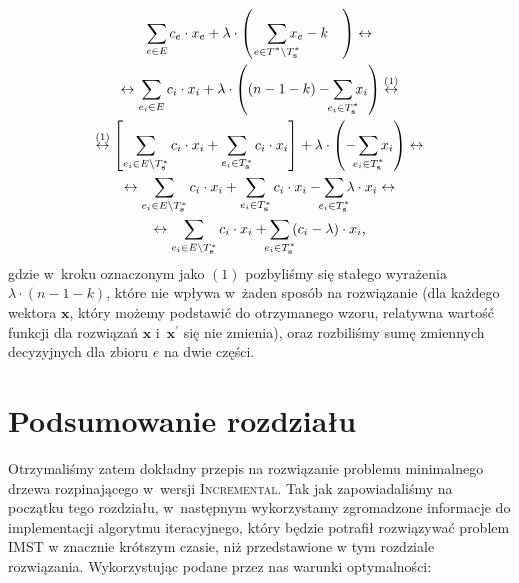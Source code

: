 \begin{gather}\label{eq:imstcosts}
	\sum_{\mathclap{e \in E}} c_{e} \cdot x_{e} + \lambda \cdot \left( \quad \sum_{\mathclap{e \in T^{\ast} \setminus T^{\ast}_{\textbf{s}}}} x_{e} - k \quad \right) \leftrightarrow \\
	\leftrightarrow \sum_{e_{i} \in E} c_{i} \cdot x_{i} + \lambda \cdot \left( \left( n - 1 - k \right) - \sum_{\mathclap{e_{i} \in T^{\ast}_{\textbf{s}}}} x_{i} \right) \overset{\left( 1 \right)}{\leftrightarrow}\\
	\overset{\left( 1 \right)}{\leftrightarrow} \left[ \sum_{e_{i} \in E \setminus T^{\ast}_{\textbf{s}}} c_{i} \cdot x_{i} + \sum_{e_{i} \in T^{\ast}_{\textbf{s}}} c_{i} \cdot x_{i} \right] + \lambda \cdot \left( - \sum_{\mathclap{e_{i} \in T^{\ast}_{\textbf{s}}}} x_{i} \right) \leftrightarrow \\
	\leftrightarrow \sum_{e_{i} \in E \setminus T^{\ast}_{\textbf{s}}} c_{i} \cdot x_{i} + \sum_{e_{i} \in T^{\ast}_{\textbf{s}}} c_{i} \cdot x_{i} - \sum_{\mathclap{e_{i} \in T^{\ast}_{\textbf{s}}}} \lambda \cdot x_{i} \leftrightarrow \\
	\leftrightarrow \sum_{e_{i} \in E \setminus T^{\ast}_{\textbf{s}}} c_{i} \cdot x_{i} + \sum_{\mathclap{e_{i} \in T^{\ast}_{\textbf{s}}}} \left( c_{i} - \lambda \right) \cdot x_{i}\label{eq:imstcosts:e}\text{,}
\end{gather}
gdzie w~kroku oznaczonym jako $\left( 1 \right)$ pozbyliśmy się stałego wyrażenia $\lambda \cdot \left( n - 1 - k \right)$, które nie wpływa w~żaden sposób na rozwiązanie (dla każdego wektora $\textbf{x}$, który możemy podstawić do otrzymanego wzoru, relatywna wartość funkcji dla rozwiązań $\textbf{x}$ i~$\textbf{x}^{\prime}$ się nie zmienia), oraz rozbiliśmy sumę zmiennych decyzyjnych dla zbioru $e$ na dwie części.




\section{Podsumowanie rozdziału}




Otrzymaliśmy zatem dokładny przepis na rozwiązanie problemu minimalnego drzewa rozpinającego w~wersji \textsc{Incremental}.
Tak jak zapowiadaliśmy na początku tego rozdziału, w~następnym wykorzystamy zgromadzone informacje do implementacji algorytmu iteracyjnego, który będzie potrafił rozwiązywać problem \textsc{IMST} w znacznie krótszym czasie, niż przedstawione w tym rozdziale rozwiązania.
Wykorzystując podane przez nas warunki optymalności:

